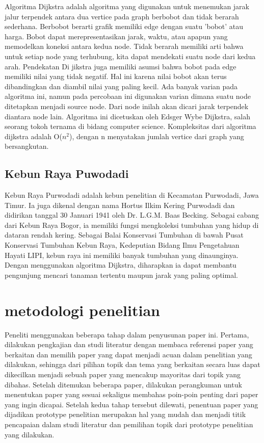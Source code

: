 \documentclass[conference]{IEEEtran}
\begin{document}
	Algoritma Dijkstra adalah algoritma yang digunakan untuk menemukan jarak jalur terpendek antara dua vertice pada graph berbobot dan tidak berarah sederhana\cite{rosen2012discrete}. Berbobot berarti grafik memiliki edge dengan suatu ’bobot’ atau harga. Bobot dapat merepresentasikan jarak, waktu, atau apapun yang memodelkan koneksi antara kedua node. Tidak berarah memiliki arti bahwa untuk setiap node yang terhubung, kita dapat mendekati suatu node dari kedua arah. Pendekatan Di jikstra juga memiliki asumsi bahwa bobot pada edge memiliki nilai yang tidak negatif. Hal ini karena nilai bobot akan terus dibandingkan dan diambil nilai yang paling kecil. Ada banyak varian pada algoritma ini, namun pada percobaan ini digunakan varian dimana suatu node ditetapkan menjadi source node. Dari node inilah akan dicari jarak terpendek diantara node lain. Algoritma ini dicetuskan oleh Edsger Wybe Dijkstra, salah seorang tokoh ternama di bidang computer science\cite{dijkstra1959note}. Kompleksitas dari algoritma dijkstra adalah O($n^2$), dengan n menyatakan jumlah vertice dari graph yang bersangkutan.
\subsection{Kebun Raya Puwodadi}
	Kebun Raya Purwodadi adalah kebun penelitian di Kecamatan Purwodadi, Jawa Timur. Ia juga dikenal dengan nama Hortus Ilkim Kering Purwodadi dan didirikan tanggal 30 Januari 1941 oleh Dr. L.G.M. Baas Becking. Sebagai cabang dari Kebun Raya Bogor, ia memiliki fungsi mengkoleksi tumbuhan yang hidup di dataran rendah kering. Sebagai Balai Konservasi Tumbuhan di bawah Pusat Konservasi Tumbuhan Kebun Raya, Kedeputian Bidang Ilmu Pengetahuan Hayati LIPI, kebun raya ini memiliki banyak tumbuhan yang dinaunginya. Dengan menggunakan algoritma Dijkstra, diharapkan ia dapat membantu pengunjung mencari tanaman tertentu maupun jarak yang paling optimal.
\section{metodologi penelitian}
	Peneliti menggunakan beberapa tahap dalam penyusunan paper ini. Pertama, dilakukan pengkajian dan studi literatur dengan membaca referensi paper yang berkaitan dan memilih paper yang dapat menjadi acuan dalam penelitian yang dilakukan, sehingga dari pilihan topik dan tema yang berkaitan secara luas dapat dikecilkan menjadi sebuah paper yang mencakup mayoritas dari topik yang dibahas. Setelah ditemukan beberapa paper, dilakukan perangkuman untuk menentukan paper yang sesuai sekaligus membahas poin-poin penting dari paper yang ingin dicapai. Setelah kedua tahap tersebut dilewati, penentuan paper yang dijadikan prototype penelitian merupakan hal yang mudah dan menjadi titik pencapaian dalam studi literatur dan pemilihan topik dari prototype penelitian yang dilakukan.
\end{document}
